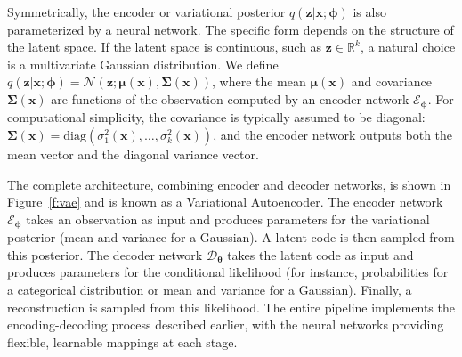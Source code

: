Symmetrically, the encoder or variational posterior $q(\mathbf{z}|\mathbf{x}; \boldsymbol{\phi})$ is also parameterized by a neural network. The specific form depends on the structure of the latent space. If the latent space is continuous, such as $\mathbf{z} \in \mathbb{R}^k$, a natural choice is a multivariate Gaussian distribution. We define $q(\mathbf{z}|\mathbf{x}; \boldsymbol{\phi}) = \mathcal{N}(\mathbf{z}; \boldsymbol{\mu}(\mathbf{x}), \boldsymbol{\Sigma}(\mathbf{x}))$, where the mean $\boldsymbol{\mu}(\mathbf{x})$ and covariance $\boldsymbol{\Sigma}(\mathbf{x})$ are functions of the observation computed by an encoder network $\mathcal{E}_{\boldsymbol{\phi}}$. For computational simplicity, the covariance is typically assumed to be diagonal: $\boldsymbol{\Sigma}(\mathbf{x}) = \text{diag}(\sigma_1^2(\mathbf{x}), \ldots, \sigma_k^2(\mathbf{x}))$, and the encoder network outputs both the mean vector and the diagonal variance vector.

The complete architecture, combining encoder and decoder networks, is shown in Figure~\ref{f:vae} and is known as a Variational Autoencoder. The encoder network $\mathcal{E}_{\boldsymbol{\phi}}$ takes an observation as input and produces parameters for the variational posterior (mean and variance for a Gaussian). A latent code is then sampled from this posterior. The decoder network $\mathcal{D}_{\boldsymbol{\theta}}$ takes the latent code as input and produces parameters for the conditional likelihood (for instance, probabilities for a categorical distribution or mean and variance for a Gaussian). Finally, a reconstruction is sampled from this likelihood. The entire pipeline implements the encoding-decoding process described earlier, with the neural networks providing flexible, learnable mappings at each stage.

